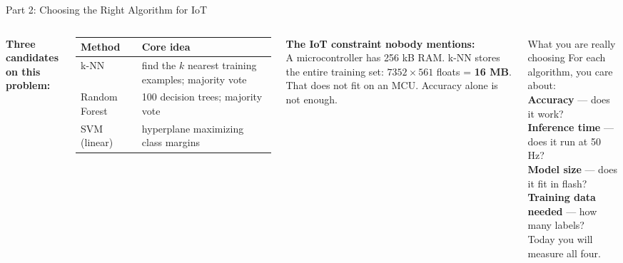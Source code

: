 \documentclass[aspectratio=169,11pt]{beamer}
\begin{document}
\begin{frame}[shrink=10]{Part 2: Choosing the Right Algorithm for IoT}
    \begin{columns}
        \textbf{Three candidates on this problem:}

        \vspace{0.2cm}
        \begin{tabular}{lp{4.2cm}}
            \toprule
            \textbf{Method} & \textbf{Core idea} \\
            \midrule
            k-NN & find the $k$ nearest training examples; majority vote \\
            Random Forest & 100 decision trees; majority vote \\
            SVM (linear) & hyperplane maximizing class margins \\
            \bottomrule
        \end{tabular}

        \vspace{0.3cm}
        \textbf{The IoT constraint nobody mentions:}\\
        A microcontroller has 256 kB RAM. k-NN stores the entire training set: $7352 \times 561$ floats = \textbf{16 MB}. That does not fit on an MCU. Accuracy alone is not enough.

        \begin{alertblock}{What you are really choosing}
            For each algorithm, you care about:\\[4pt]
            \textbf{Accuracy} --- does it work?\\
            \textbf{Inference time} --- does it run at 50 Hz?\\
            \textbf{Model size} --- does it fit in flash?\\
            \textbf{Training data needed} --- how many labels?\\[4pt]
            Today you will measure all four.
        \end{alertblock}
    \end{columns}
\end{frame}
\end{document}
